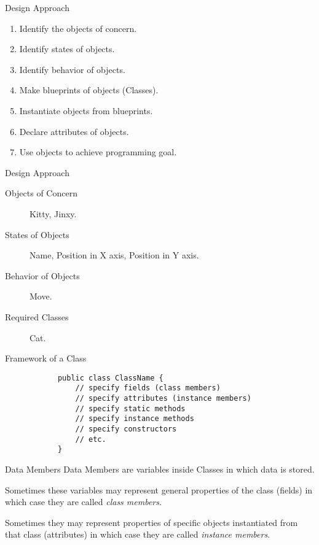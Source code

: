 \documentclass[10pt, compress]{beamer}
\begin{document}
\begin{slide}
	\begin{block}{Design Approach}
		\begin{enumerate}
			\item[] Identify the objects of concern.
			\item[] Identify states of objects.
			\item[] Identify behavior of objects.
			\item[] Make blueprints of objects (Classes).
			\item[] Instantiate objects from blueprints.
			\item[] Declare attributes of objects.
			\item[] Use objects to achieve programming goal.
		\end{enumerate}
	\end{block}
\end{slide}

\begin{slide}
	\begin{block}{Design Approach}
		\begin{description}
			\item[Objects of Concern] Kitty, Jinxy.
			\item[States of Objects] Name, Position in X axis, Position in Y axis.
			\item[Behavior of Objects] Move.
			\item[Required Classes] Cat.
		\end{description}
	\end{block}
\end{slide}

\begin{slide}
	\begin{block}{Framework of a Class}
		\begin{verbatim}
			public class ClassName {
			    // specify fields (class members)
			    // specify attributes (instance members)
			    // specify static methods
			    // specify instance methods
			    // specify constructors
			    // etc.
			}
		\end{verbatim}
	\end{block}
\end{slide}

\begin{slide}
	\begin{block}{Data Members}
		Data Members are variables inside Classes in which data is stored.

		Sometimes these variables may represent general properties of the class (fields) in which case they are called \textit{class members}.

		Sometimes they may represent properties of specific objects instantiated from that class (attributes) in which case they are called \textit{instance members}.
	\end{block}
\end{slide}
\end{document}
